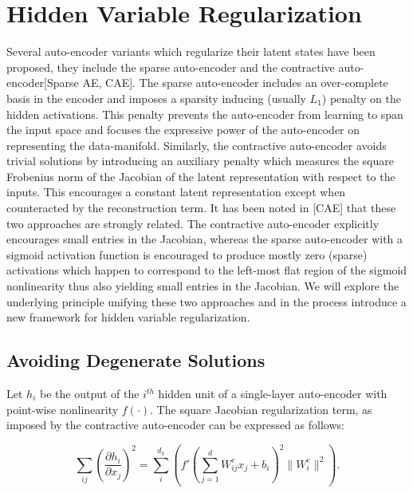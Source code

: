 \documentclass{article} %
\begin{document}
\section{Hidden Variable Regularization}    
Several auto-encoder variants which regularize their latent states have been
proposed, they include the sparse auto-encoder and the contractive
auto-encoder[Sparse AE, CAE]. The sparse auto-encoder includes an over-complete
basis in the encoder and imposes a sparsity inducing (usually $L_1$) penalty on
the hidden activations. This penalty prevents the auto-encoder from learning to
span the input space and focuses the expressive power of the auto-encoder on
representing the data-manifold. Similarly, the contractive auto-encoder avoids
trivial solutions by introducing an auxiliary penalty which measures the square
Frobenius norm of the Jacobian of the latent representation with respect to the
inputs. This encourages a constant latent representation except when
counteracted by the reconstruction term. It has been noted in [CAE] that these
two approaches are strongly related. The contractive auto-encoder explicitly
encourages small entries in the Jacobian, whereas the sparse auto-encoder with
a sigmoid activation function is encouraged to produce mostly zero (sparse)
activations which happen to correspond to the left-most flat region of the
sigmoid nonlinearity thus also yielding small entries in the Jacobian. We will
explore the underlying principle unifying these two approaches and in the
process introduce a new framework for hidden variable regularization. 

\subsection{Avoiding Degenerate Solutions} 
Let $h_i$ be the output of the $i^{th}$ hidden unit of a single-layer
auto-encoder with point-wise nonlinearity $f(\cdot)$. The square Jacobian
regularization term, as imposed by the contractive auto-encoder can be
expressed as follows: 

\begin{equation} \sum_{ij} \left(\frac{\partial h_i}{\partial x_j} \right)^2 =
\sum_i ^{d_h} \left(f'(\sum_{j=1}^d W^e_{ij}x_j + b_i)^2 \| W^e_i \| ^2
\right).
\end{equation}  
 
\end{document}
